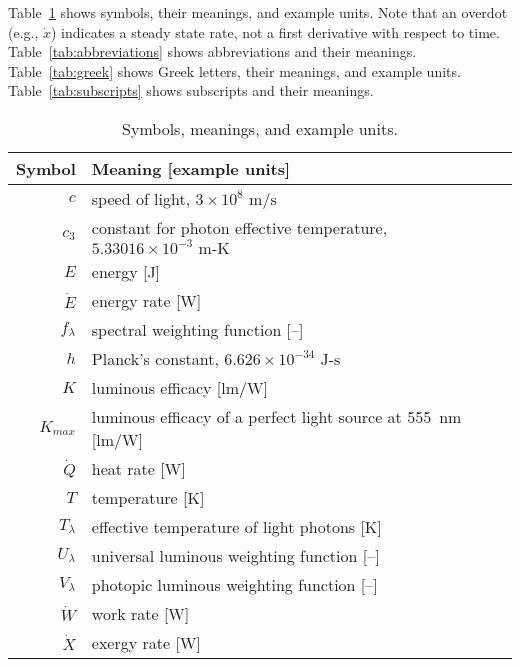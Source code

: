 
\noindent 
Table~\ref{tab:symbols} shows symbols, their meanings, and example units.
Note that an overdot (e.g., $\dot{x}$) indicates a steady state rate,
not a first derivative with respect to time.
Table~\ref{tab:abbreviations} shows abbreviations and their meanings.
Table~\ref{tab:greek} shows Greek letters, their meanings, and example units.
Table~\ref{tab:subscripts} shows subscripts and their meanings.


  
\begin{table}
\centering %
\caption{Symbols, meanings, and example units.}
\begin{tabular}{r l}
\toprule
Symbol & Meaning [example units] \\
\midrule
$c$ & speed of light, $3 \times 10^8 \text{ m/s}$ \\
$c_3$ & constant for photon effective temperature, $5.33016 \times 10^{-3} \text{ m-K}$ \\
$E$ & energy [J] \\
$\dot{E}$ & energy rate [W] \\
$f_\lambda$ & spectral weighting function [--] \\
$h$ & Planck's constant, $6.626 \times 10^{-34} \text{ J-s}$ \\
$K$ & luminous efficacy [lm/W] \\
$K_{max}$ & luminous efficacy of a perfect light source at 555~nm [lm/W] \\
$\dot{Q}$ & heat rate [W] \\
$T$ & temperature [K] \\
$T_\lambda$ & effective temperature of light photons [K] \\
$U_\lambda$ & universal luminous weighting function [--] \\
$V_\lambda$ & photopic luminous weighting function [--] \\
$\dot{W}$ & work rate [W] \\
$\dot{X}$ & exergy rate [W] \\
\bottomrule
\end{tabular}
\label{tab:symbols}
\end{table}


